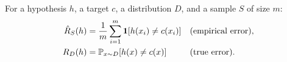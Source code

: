 \begin{defn}
\label{def:errors}
For a hypothesis $h$, a target $c$, a distribution $D$, and a sample
$S$ of size $m$:
\begin{align*}
  \hat{R}_S(h) &= \frac{1}{m} \sum_{i=1}^{m} \mathbf{1}[h(x_i) \neq c(x_i)]
    && \text{(empirical error)}, \\
  R_D(h) &= \mathbb{P}_{x \sim D}\!\left[ h(x) \neq c(x) \right]
    && \text{(true error)}.
\end{align*}
\end{defn}
